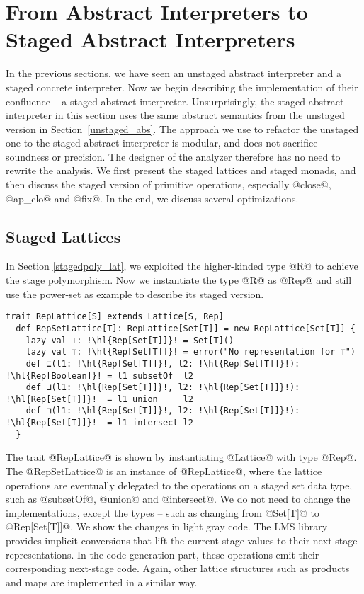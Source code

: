\section{From Abstract Interpreters to Staged Abstract Interpreters} \label{sai}

In the previous sections, we have seen an unstaged abstract interpreter and a
staged concrete interpreter. Now we begin describing the implementation of
their confluence -- a staged abstract interpreter.  Unsurprisingly, the staged
abstract interpreter in this section uses the same abstract semantics from the
unstaged version in Section~\ref{unstaged_abs}.  The approach we use to refactor
the unstaged one to the staged abstract interpreter is modular, and does not
sacrifice soundness or precision. The designer of the analyzer therefore has no
need to rewrite the analysis. We first present the staged lattices and staged
monads, and then discuss the staged version of primitive operations, especially
@close@, @ap_clo@ and @fix@. In the end, we discuss several optimizations.

\subsection{Staged Lattices}

In Section \ref{stagedpoly_lat}, we exploited the higher-kinded type @R@ to
achieve the stage polymorphism. Now we instantiate the type @R@ as @Rep@ and
still use the power-set as example to describe its staged version.
\begin{lstlisting}[escapechar=!]
  trait RepLattice[S] extends Lattice[S, Rep]
  def RepSetLattice[T]: RepLattice[Set[T]] = new RepLattice[Set[T]] {
    lazy val ⊥: !\hl{Rep[Set[T]]}! = Set[T]()
    lazy val ⊤: !\hl{Rep[Set[T]]}! = error("No representation for ⊤")
    def ⊑(l1: !\hl{Rep[Set[T]]}!, l2: !\hl{Rep[Set[T]]}!): !\hl{Rep[Boolean]}! = l1 subsetOf  l2
    def ⊔(l1: !\hl{Rep[Set[T]]}!, l2: !\hl{Rep[Set[T]]}!): !\hl{Rep[Set[T]]}!  = l1 union     l2
    def ⊓(l1: !\hl{Rep[Set[T]]}!, l2: !\hl{Rep[Set[T]]}!): !\hl{Rep[Set[T]]}!  = l1 intersect l2
  }
\end{lstlisting}

The trait @RepLattice@ is shown by instantiating @Lattice@ with type @Rep@.
The @RepSetLattice@ is an instance of @RepLattice@, where the lattice operations
are eventually delegated to the operations on a staged set data type, such as
@subsetOf@, @union@ and @intersect@. We do not need to change the
implementations, except the types -- such as changing from @Set[T]@ to
@Rep[Set[T]]@.  We show the changes in light gray code. The LMS library
provides implicit conversions that lift the current-stage values to their
next-stage representations. In the code generation part, these operations emit
their corresponding next-stage code. Again, other lattice structures such as
products and maps are implemented in a similar way.

